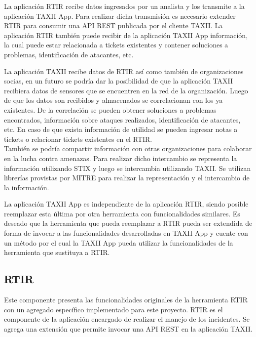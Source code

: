 	La aplicación RTIR recibe datos ingresados por un analista y los transmite a la aplicación
		TAXII App. Para realizar dicha transmisión es necesario extender RTIR para consumir una API REST publicada por el
		cliente TAXII. La aplicación RTIR también puede recibir de la aplicación TAXII App información, la cual puede
		estar relacionada a tickets existentes y contener soluciones a problemas, identificación de atacantes, etc.
	
	
	\bigskip
	
	La aplicación TAXII recibe datos de RTIR así como también de organizaciones socias, en un
		futuro se podría dar la posibilidad de que la aplicación TAXII recibiera datos de sensores que se encuentren en la red
		de la organización. Luego de que los datos son recibidos y almacenados se correlacionan con los ya existentes. De la
		correlación se pueden obtener soluciones a problemas encontrados, información sobre ataques realizados, identificación
		de atacantes, etc. En caso de que exista información de utilidad se pueden ingresar notas a tickets o relacionar
		tickets existentes en el RTIR.\\
		\bigskip
	También se podría compartir información con otras organizaciones para colaborar en la lucha
		contra amenazas. Para realizar dicho intercambio se representa la información utilizando STIX y luego se intercambia
		utilizando TAXII. Se utilizan librerías provistas por MITRE para realizar la representación y el intercambio de la
		información.
	
	
	\bigskip
	
	La aplicación TAXII App es independiente de la aplicación RTIR, siendo posible reemplazar esta
		última por otra herramienta con funcionalidades similares. Es deseado que la herramienta que pueda reemplazar a RTIR
		pueda ser extendida de forma de invocar a las funcionalidades desarrolladas en TAXII App y cuente con un método por el
		cual la TAXII App pueda utilizar la funcionalidades de la herramienta que sustituya a RTIR.
	
	\subsection{RTIR}
	Este componente presenta las funcionalidades originales de la herramienta RTIR con un agregado
		específico implementado para este proyecto. RTIR es el componente de la aplicación encargado de realizar el manejo de
		los incidentes. Se agrega una extensión que permite invocar una API REST en la aplicación TAXII.
	\bigskip
	
